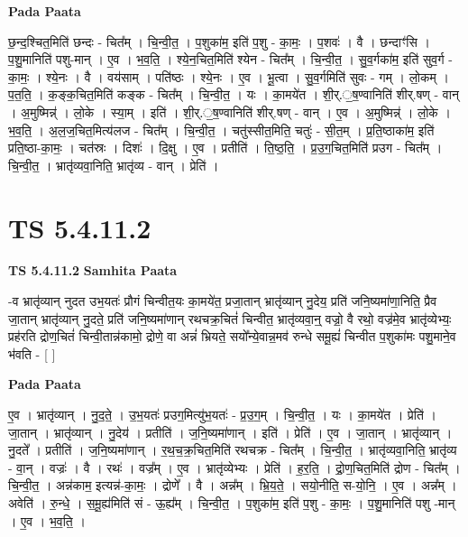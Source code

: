 \documentclass[17pt]{extarticle}
\begin{document}
\textbf{Pada Paata} \newline

छ॒न्द॒श्चित॒मिति॑ छन्दः - चित᳚म् । चि॒न्वी॒त॒ । प॒शुका॑म॒ इति॑ प॒शु - का॒मः॒ । प॒शवः॑ । वै । छन्दाꣳ॑सि । प॒शु॒मानिति॑ पशु-मान् । ए॒व । भ॒व॒ति॒ । श्ये॒न॒चित॒मिति॑ श्येन - चित᳚म् । चि॒न्वी॒त॒ । सु॒व॒र्गका॑म॒ इति॑ सुव॒र्ग - का॒मः॒ । श्ये॒नः । वै । वय॑साम् । पति॑ष्ठः । श्ये॒नः । ए॒व । भू॒त्वा । सु॒व॒र्गमिति॑ सुवः - गम् । लो॒कम् । प॒त॒ति॒ । क॒ङ्क॒चित॒मिति॑ कङ्क - चित᳚म् । चि॒न्वी॒त॒ । यः । का॒मये॑त । शी॒र्.॒ष॒ण्वानिति॑ शीर्.षण् - वान् । अ॒मुष्मिन्न्॑ । लो॒के । स्या॒म् । इति॑ । शी॒र्.॒ष॒ण्वानिति॑ शीर्.षण् - वान् । ए॒व । अ॒मुष्मिन्न्॑ । लो॒के । भ॒व॒ति॒ । अ॒ल॒ज॒चित॒मित्य॑लज - चित᳚म् । चि॒न्वी॒त॒ । चतु॑स्सीत॒मिति॒ चतुः॑ - सी॒त॒म् । प्र॒ति॒ष्ठाका॑म॒ इति॑ प्रति॒ष्ठा-का॒मः॒ । चत॑स्रः । दिशः॑ । दि॒क्षु । ए॒व । प्रतीति॑ । ति॒ष्ठ॒ति॒ । प्र॒उ॒ग॒चित॒मिति॑ प्र‌उग - चित᳚म् । चि॒न्वी॒त॒ । भ्रातृ॑व्यवा॒निति॒ भ्रातृ॑व्य - वान् । प्रेति॑ ।  \newline




\section*{ TS 5.4.11.2 }

\textbf{TS 5.4.11.2 } \newline
\textbf{Samhita Paata} \newline

-व भ्रातृ॑व्यान् नुदत उभ॒यतः॑ प्रौगं चिन्वीत॒यः का॒मये॑त॒ प्रजा॒तान् भ्रातृ॑व्यान् नु॒देय॒ प्रति॑ जनि॒ष्यमा॑णा॒निति॒ प्रैव जा॒तान् भ्रातृ॑व्यान् नु॒दते॒ प्रति॑ जनि॒ष्यमा॑णान् रथचक्र॒चितं॑ चिन्वीत॒ भ्रातृ॑व्यवा॒न्॒ वज्रो॒ वै रथो॒ वज्र॑मे॒व भ्रातृ॑व्येभ्यः॒ प्रह॑रति द्रोण॒चितं॑ चिन्वी॒तान्न॑कामो॒ द्रोणे॒ वा अन्नं॑ भ्रियते॒ सयो᳚न्ये॒वान्न॒मव॑ रुन्धे समू॒ह्यं॑ चिन्वीत प॒शुका॑मः पशु॒माने॒व भ॑वति - [  ] \newline

\textbf{Pada Paata} \newline

ए॒व । भ्रातृ॑व्यान् । नु॒द॒ते॒ । उ॒भ॒यतः॑ प्र‌उग॒मित्यु॑भ॒यतः॑ - प्र॒उ॒ग॒म् । चि॒न्वी॒त॒ । यः । का॒मये॑त । प्रेति॑ । जा॒तान् । भ्रातृ॑व्यान् । नु॒देय॑ । प्रतीति॑ । ज॒नि॒ष्यमा॑णान् । इति॑ । प्रेति॑ । ए॒व । जा॒तान् । भ्रातृ॑व्यान् । नु॒दते᳚ । प्रतीति॑ । ज॒नि॒ष्यमा॑णान् । र॒थ॒च॒क्र॒चित॒मिति॑ रथचक्र - चित᳚म् । चि॒न्वी॒त॒ । भ्रातृ॑व्यवा॒निति॒ भ्रातृ॑व्य - वा॒न् । वज्रः॑ । वै । रथः॑ । वज्र᳚म् । ए॒व । भ्रातृ॑व्येभ्यः । प्रेति॑ । ह॒र॒ति॒ । द्रो॒ण॒चित॒मिति॑ द्रोण - चित᳚म् । चि॒न्वी॒त॒ । अन्न॑काम॒ इत्यन्न॑-का॒मः॒ । द्रोणे᳚ । वै । अन्न᳚म् । भ्रि॒य॒ते॒ । सयो॒नीति॒ स-यो॒नि॒ । ए॒व । अन्न᳚म् । अवेति॑ । रु॒न्धे॒ । स॒मू॒ह्य॑मिति॑ सं - ऊ॒ह्य᳚म् । चि॒न्वी॒त॒ । प॒शुका॑म॒ इति॑ प॒शु - का॒मः॒ । प॒शु॒मानिति॑ पशु -मान् । ए॒व । भ॒व॒ति॒ ।  \newline
\end{document}
